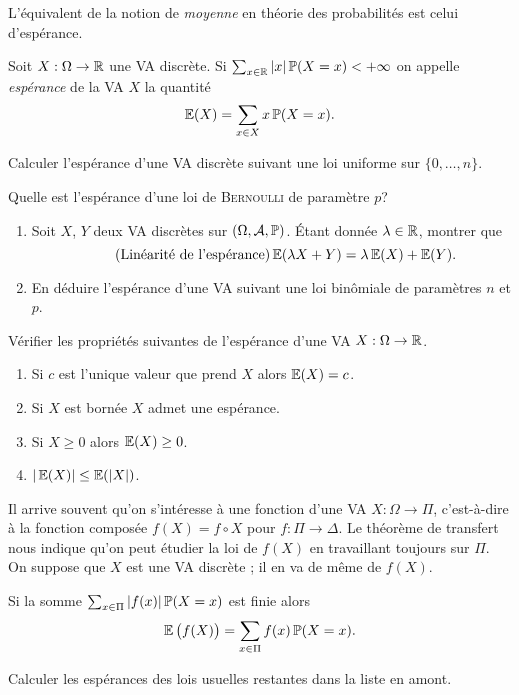 \documentclass[11pt, a4paper]{article}
\begin{document}
L'équivalent de la notion de \emph{moyenne} en théorie des
probabilités est celui d'espérance.
\begin{defn}
  Soit $X : \Omega \to \mathbb{R}$ une VA discrète. Si
  $\sum_{x\in \mathbb{R}} |x|\operatorname{\mathbb{P}}(X = x) < + \infty$ on appelle
  \emph{espérance} de la VA $X$ la quantité
  \[
    \operatorname{\mathbb{E}}(X) = \sum_{x \in X} x\operatorname{\mathbb{P}}(X = x).
  \]
\end{defn}
\begin{question}
  Calculer l'espérance d'une VA discrète suivant une loi uniforme sur
  $\{0, \ldots, n\}$.
\end{question}
\begin{question}
  Quelle est l'espérance d'une loi de \textsc{Bernoulli} de paramètre $p$?
\end{question}
\begin{question}
  \begin{enumerate}
  \item
    Soit $X$, $Y$ deux VA discrètes sur $(\Omega, \mathcal{A}, \operatorname{\mathbb{P}})$. Étant
    donnée $\lambda \in \mathbb{R}$, montrer que
    \begin{equation}
      \label{eq:linearitesperance}
      \tag{Linéarité de l'espérance}
      \operatorname{\mathbb{E}}(\lambda X + Y) = \lambda\operatorname{\mathbb{E}}(X) + \operatorname{\mathbb{E}}(Y).
    \end{equation}
  \item En déduire l'espérance d'une VA suivant une loi binômiale de
    paramètres $n$ et $p$.
  \end{enumerate}
\end{question}
\begin{question}
  Vérifier les propriétés suivantes de l'espérance d'une VA
  $X : \Omega \to \mathbb{R}$.
  \begin{enumerate}
  \item Si $c$ est l'unique valeur que prend $X$ alors $\operatorname{\mathbb{E}}(X) = c$.
  \item Si $X$ est bornée $X$ admet une espérance.
  \item Si $X \geq 0$ alors $\operatorname{\mathbb{E}}(X) \geq 0$.
  \item $|\operatorname{\mathbb{E}}(X)| \leq \operatorname{\mathbb{E}}(|X|)$.
  \end{enumerate}
\end{question}
Il arrive souvent qu'on s'intéresse à une fonction d'une VA
$X : \Omega \to \Pi$, c'est-à-dire à la fonction composée
$f(X) = f\circ X$ pour $f : \Pi \to \Delta$. Le théorème de transfert
nous indique qu'on peut étudier la loi de $f(X)$ en travaillant
toujours sur $\Pi$. On suppose que $X$ est une VA discrète ; il en va
de même de $f(X)$.
\begin{thm}
  Si la somme $\sum_{x \in \Pi}|f(x)|\operatorname{\mathbb{P}}(X = x)$ est finie alors
  \[
    \operatorname{\mathbb{E}}\big(f(X)\big) = \sum_{x \in \Pi}f(x)\operatorname{\mathbb{P}}(X = x).
  \]
\end{thm}
\begin{question}
  Calculer les espérances des lois usuelles restantes dans la liste en
  amont.
\end{question}
\end{document}
